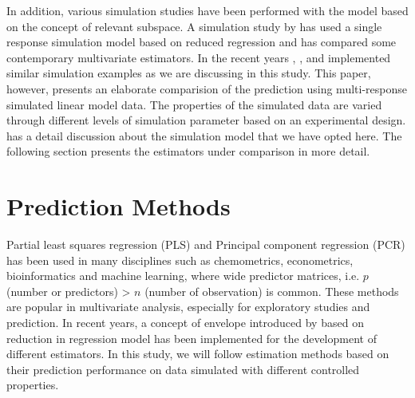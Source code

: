 \documentclass[12pt,3p,authoryear]{elsarticle}
\begin{document}
In addition, various simulation studies have been performed with the
model based on the concept of relevant subspace. A simulation study by
\citet{Alm_y_1996} has used a single response simulation model based on
reduced regression and has compared some contemporary multivariate
estimators. In the recent years \citet{helland2012near},
\citet{saebo2015simrel}, \citet{helland2016algorithms} and
\citet{Rimal2018} implemented similar simulation examples as we are
discussing in this study. This paper, however, presents an elaborate
comparision of the prediction using multi-response simulated linear
model data. The properties of the simulated data are varied through
different levels of simulation parameter based on an experimental
design. \citet{Rimal2018} has a detail discussion about the simulation
model that we have opted here. The following section presents the
estimators under comparison in more detail.

\section{Prediction Methods}\label{prediction-methods}

Partial least squares regression (PLS) and Principal component
regression (PCR) has been used in many disciplines such as chemometrics,
econometrics, bioinformatics and machine learning, where wide predictor
matrices, i.e. \(p\) (number or predictors) \textgreater{} \(n\) (number
of observation) is common. These methods are popular in multivariate
analysis, especially for exploratory studies and prediction. In recent
years, a concept of envelope introduced by \citet{Cook2007a} based on
reduction in regression model has been implemented for the development
of different estimators. In this study, we will follow estimation
methods based on their prediction performance on data simulated with
different controlled properties.
\end{document}
